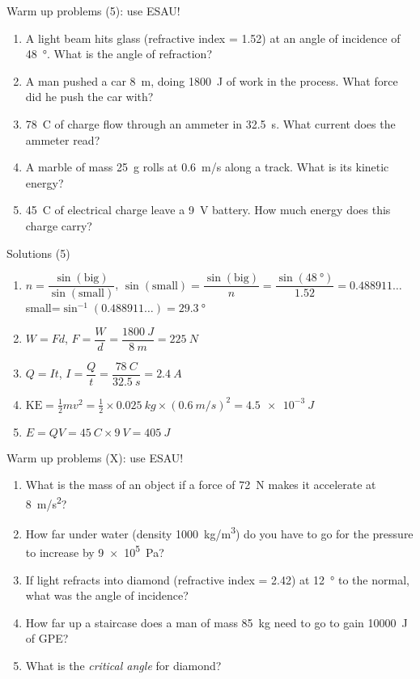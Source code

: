 \documentclass[14pt]{beamer}
\begin{document}
\begin{frame}{Warm up problems (5): use ESAU!}
\vspace*{-0.8em}\begin{enumerate}
\item\label{15.3} A light beam hits glass (refractive index = 1.52) at an angle of incidence of \SI{48}{\degree}.  What is the angle of refraction?
\item\label{5.2} A man pushed a car \SI{8}{m}, doing \SI{1800}{J} of work in the process.  What force did he push the car with?
\item\label{10.2} \SI{78}{C} of charge flow through an ammeter in \SI{32.5}{s}.  What current does the ammeter read?
\item\label{6.1} A marble of mass \SI{25}{g} rolls at \SI{0.6}{m/s} along a track.  What is its kinetic energy?
\item\label{13.1} \SI{45}{C} of electrical charge leave a \SI{9}{V} battery.  How much energy does this charge carry?
\end{enumerate}
\end{frame}

\begin{frame}{Solutions (5)}
\vspace*{-0.8em}\begin{enumerate}
\item\label{15.3} $n=\dfrac{\sin(\text{big})}{\sin(\text{small})}$, $\sin(\text{small})=\dfrac{\sin(\text{big})}{n}=\dfrac{\sin(\SI{48}{\degree})}{1.52}=0.488911\ldots$\\
small=$\sin^{-1}(0.488911\ldots)=\SI{29.3}{\degree}$
\item\label{5.2} $W=Fd$, $F=\dfrac{W}{d}=\dfrac{\SI{1800}{J}}{\SI{8}{m}}=\SI{225}{N}$
\item\label{10.2} $Q=It$, $I=\dfrac{Q}{t}=\dfrac{\SI{78}{C}}{\SI{32.5}{s}}=\SI{2.4}{A}$
\item\label{6.1} $\text{KE}=\frac{1}{2}mv^{2}=\frac{1}{2}\times\SI{0.025}{kg}\times(\SI{0.6}{m/s})^2=\SI{4.5e-3}{J}$
\item\label{13.1} $E=QV=\SI{45}{C}\times\SI{9}{V}=\SI{405}{J}$
\end{enumerate}
\end{frame}

\begin{frame}{Warm up problems (X): use ESAU!}
\vspace*{-0.8em}\begin{enumerate}
\item\label{2.2} What is the mass of an object if a force of \SI{72}{N} makes it accelerate at \SI{8}{m/s^{2}}?
\item\label{18.3} How far under water (density \SI{1000}{kg/m^3}) do you have to go for the pressure to increase by \SI{9e5}{Pa}?
\item\label{15.2} If light refracts into diamond (refractive index = 2.42) at \SI{12}{\degree} to the normal, what was the angle of incidence?
\item\label{7.3} How far up a staircase does a man of mass \SI{85}{kg} need to go to gain \SI{10000}{J} of GPE?
\item\label{16.3} What is the \emph{critical angle} for diamond?
\end{enumerate}
\end{frame}
\end{document}
